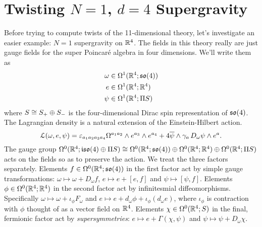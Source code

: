 \documentclass[10pt, oneside]{article}
\begin{document}
\section{Twisting $N=1$, $d=4$ Supergravity}
Before trying to compute twists of the 11-dimensional theory, let's investigate an easier example: $N=1$ supergravity on $\mathbb{R}^4$.  The fields in this theory really are just gauge fields for the super Poincar\'e algebra in four dimensions.  We'll write them as
\begin{align*}
\omega &\in \Omega^1(\mathbb{R}^4; \mathfrak{so}(4)) \\
e &\in \Omega^1(\mathbb{R}^4; \mathbb{R}^4) \\
\psi &\in \Omega^1(\mathbb{R}^4; \Pi S)
\end{align*}
where $S \cong S_+ \oplus S_-$ is the four-dimensional Dirac spin representation of $\mathfrak{so}(4)$.  The Lagrangian density is a natural extension of the Einstein-Hilbert action.
\[\mathcal{L}(\omega, e, \psi) = \varepsilon_{a_1 a_2 a_3 a_4} \Omega^{a_1 a_2} \wedge e^{a_3} \wedge e^{a_4} + 4 \overline{\psi} \wedge \gamma_a \,D_\omega \psi \wedge e^a.\]
The gauge group $\Omega^0(\mathbb{R}^4; \mathfrak{iso}(4) \oplus \Pi S) \cong \Omega^0(\mathbb{R}^4; \mathfrak{so}(4)) \oplus \Omega^0(\mathbb{R}^4; \mathbb{R}^4) \oplus \Omega^0(\mathbb{R}^4; \Pi S)$ acts on the fields so as to preserve the action.  We treat the three factors separately.  Elements $f \in \Omega^0(\mathbb{R}^4; \mathfrak{so}(4))$ in the first factor act by simple gauge transformations: $\omega \mapsto \omega + D_\omega f$, $e \mapsto e + [e,f]$ and $\psi \mapsto [\psi,f]$.  Elements $\phi \in \Omega^0(\mathbb{R}^4; \mathbb{R}^4)$ in the second factor act by infinitesmial diffeomorphisms.  Specifically $\omega \mapsto \omega + \iota_\phi F_\omega$ and $e \mapsto e + d_\omega \phi  + \iota_\phi (d_\omega e)$, where $\iota_\phi$ is contraction with $\phi$ thought of as a vector field on $\mathbb{R}^4$.  Elements $\chi \in \Omega^0(\mathbb{R}^4; S)$ in the final, fermionic factor act by \emph{supersymmetries}: $e \mapsto e + \Gamma(\chi, \psi)$ and $\psi \mapsto \psi + D_\omega \chi$.
\end{document}

